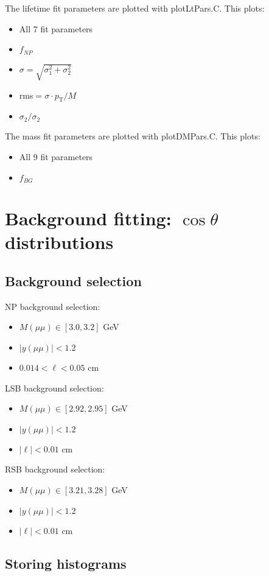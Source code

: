 \documentclass{article}
\newcommand{\pt}{p_\text{T}}
\newcommand{\cost}{\cos\theta}
\begin{document}
The lifetime fit parameters are plotted with plotLtPars.C. This plots:
\begin{itemize}
\item All 7 fit parameters
\item $f_{NP}$
\item $\sigma=\sqrt{\sigma_1^2+\sigma_2^2}$
\item rms$=\sigma\cdot\pt/M$
\item $\sigma_2/\sigma_2$
\end{itemize}

The mass fit parameters are plotted with plotDMPars.C. This plots:
\begin{itemize}
\item All 9 fit parameters
\item $f_{BG}$
\end{itemize}

\pagebreak

\section{Background fitting: $\cost$ distributions}
\subsection{Background selection}

NP background selection:
\begin{itemize}
\item $M(\mu\mu)\in[3.0,3.2]$ GeV
\item $|y(\mu\mu)|<1.2$
\item $0.014 < \ell < 0.05$ cm
\end{itemize}

LSB background selection:
\begin{itemize}
\item $M(\mu\mu)\in[2.92,2.95]$ GeV
\item $|y(\mu\mu)|<1.2$
\item $|\ell| < 0.01$ cm
\end{itemize}

RSB background selection:
\begin{itemize}
\item $M(\mu\mu)\in[3.21,3.28]$ GeV
\item $|y(\mu\mu)|<1.2$
\item $|\ell| < 0.01$ cm
\end{itemize}

\subsection{Storing histograms}
\end{document}
